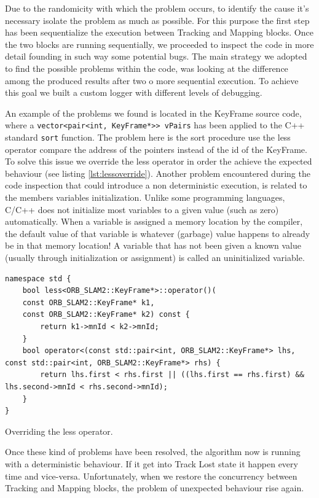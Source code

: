 Due to the randomicity with which the problem occurs, to identify the cause it's necessary isolate the problem as much as possible. For this purpose the first step has been sequentialize the execution between Tracking and Mapping blocks.
Once the two blocks are running sequentially, we proceeded to inspect the code in more detail founding in such way some potential bugs.
The main strategy we adopted to find the possible problems within the code, was looking at the difference among the produced results after two o more sequential execution. To achieve this goal we built a custom logger with different levels of debugging.

An example of the problems we found is located in the KeyFrame source code, where a \texttt{vector<pair<int, KeyFrame*>> vPairs} has been applied to the C++ standard \texttt{sort} function. The problem here is the sort procedure use the less operator compare the address of the pointers instead of the id of the KeyFrame.
To solve this issue we override the less operator in order the achieve the expected behaviour (see listing \ref{lst:lessoverride}).
Another problem encountered during the code inspection that could introduce a non deterministic execution, is related to the members variables initialization.
Unlike some programming languages, C/C++ does not initialize most variables to a given value (such as zero) automatically. When a variable is assigned a memory location by the compiler, the default value of that variable is whatever (garbage) value happens to already be in that memory location! A variable that has not been given a known value (usually through initialization or assignment) is called an uninitialized variable.

\begin{listing}[tbp]
\begin{verbatim}
namespace std {
    bool less<ORB_SLAM2::KeyFrame*>::operator()(
    const ORB_SLAM2::KeyFrame* k1,
    const ORB_SLAM2::KeyFrame* k2) const {
        return k1->mnId < k2->mnId;
    }
    bool operator<(const std::pair<int, ORB_SLAM2::KeyFrame*> lhs, const std::pair<int, ORB_SLAM2::KeyFrame*> rhs) {
        return lhs.first < rhs.first || ((lhs.first == rhs.first) && lhs.second->mnId < rhs.second->mnId);
    }
}
\end{verbatim} 
\caption{Overriding the less operator.}
\label{lst:lessoverride}
\end{listing}

Once these kind of problems have been resolved, the algorithm now is running with a deterministic behaviour. If it get into Track Lost state it happen every time and vice-versa. Unfortunately, when we restore the concurrency between Tracking and Mapping blocks, the problem of unexpected behaviour rise again.

